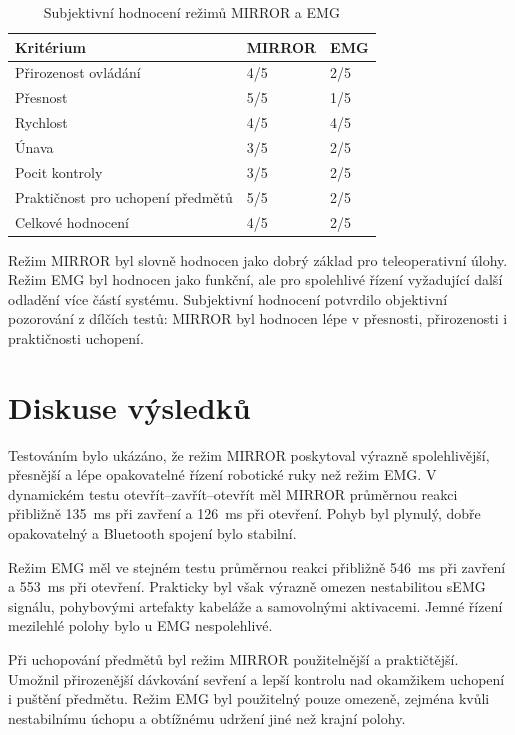 \begin{table}[H]
\centering
\caption{Subjektivní hodnocení režimů MIRROR a EMG}
\label{tab:subjektivni-hodnoceni}
\begin{tabular}{|p{}|p{}|p{}|}
\hline
\textbf{Kritérium} & \textbf{MIRROR} & \textbf{EMG} \\
\hline
Přirozenost ovládání & 4/5 & 2/5 \\
\hline
Přesnost & 5/5 & 1/5 \\
\hline
Rychlost & 4/5 & 4/5 \\
\hline
Únava & 3/5 & 2/5 \\
\hline
Pocit kontroly & 3/5 & 2/5 \\
\hline
Praktičnost pro uchopení předmětů & 5/5 & 2/5 \\
\hline
Celkové hodnocení & 4/5 & 2/5 \\
\hline
\end{tabular}
\end{table}

Režim MIRROR byl slovně hodnocen jako dobrý základ pro teleoperativní úlohy. Režim EMG byl hodnocen jako funkční, ale pro spolehlivé řízení vyžadující další odladění více částí systému. Subjektivní hodnocení potvrdilo objektivní pozorování z dílčích testů: MIRROR byl hodnocen lépe v přesnosti, přirozenosti i praktičnosti uchopení.

\section{Diskuse výsledků}
\label{sec:diskuse-vysledku}

Testováním bylo ukázáno, že režim MIRROR poskytoval výrazně spolehlivější, přesnější a lépe opakovatelné řízení robotické ruky než režim EMG\@. V dynamickém testu otevřít--zavřít--otevřít měl MIRROR průměrnou reakci přibližně 135~ms při zavření a 126~ms při otevření. Pohyb byl plynulý, dobře opakovatelný a Bluetooth spojení bylo stabilní.

Režim EMG měl ve stejném testu průměrnou reakci přibližně 546~ms při zavření a 553~ms při otevření. Prakticky byl však výrazně omezen nestabilitou sEMG signálu, pohybovými artefakty kabeláže a samovolnými aktivacemi. Jemné řízení mezilehlé polohy bylo u EMG nespolehlivé.

Při uchopování předmětů byl režim MIRROR použitelnější a praktičtější. Umožnil přirozenější dávkování sevření a lepší kontrolu nad okamžikem uchopení i puštění předmětu. Režim EMG byl použitelný pouze omezeně, zejména kvůli nestabilnímu úchopu a obtížnému udržení jiné než krajní polohy.

